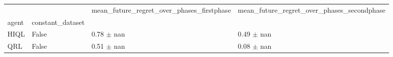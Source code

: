 \begin{tabular}{llll}
\toprule
 &  & mean_future_regret_over_phases_firstphase & mean_future_regret_over_phases_secondphase \\
agent & constant_dataset &  &  \\
\midrule
HIQL & False & 0.78 $\pm$ nan & 0.49 $\pm$ nan \\
\cline{1-4}
QRL & False & 0.51 $\pm$ nan & 0.08 $\pm$ nan \\
\cline{1-4}
\bottomrule
\end{tabular}
